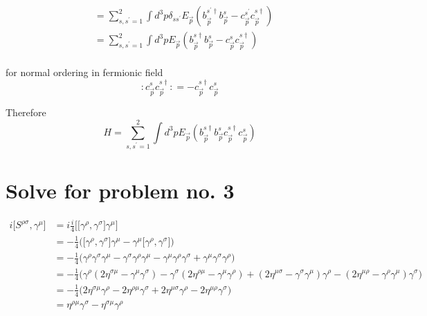 \documentclass[12pt, letterpaper]{article}
\newcommand*{\1}{\hspace{1pt}}
\begin{document}
\begin{align*}
    &= \sum _{s, s^{\prime} = 1} ^{2} \int d ^{3}p \delta _{s s^{\prime}} E_{\overrightarrow{p}}(b^{s ^{\prime} \dagger} _{\overrightarrow{p}}b^{s} _{\overrightarrow{p}} - c^{s ^{\prime}} _{\overrightarrow{p}}c^{s \dagger} _{\overrightarrow{p}}) \\
    &= \sum _{s, s^{\prime} = 1} ^{2} \int d ^{3}p E_{\overrightarrow{p}}(b^{s \dagger} _{\overrightarrow{p}}b^{s} _{\overrightarrow{p}} - c^{s} _{\overrightarrow{p}}c^{s \dagger} _{\overrightarrow{p}}) \\
\end{align*}

for normal ordering in fermionic field 
\begin{equation}
    :c^{s} _{\overrightarrow{p}}c^{s \dagger} _{\overrightarrow{p}}: =  - c^{s \dagger} _{\overrightarrow{p}}c^{s} _{\overrightarrow{p}}
\end{equation}

Therefore 
\begin{equation}
   H = \sum _{s, s^{\prime} = 1} ^{2} \int d ^{3}p E_{\overrightarrow{p}}(b^{s \dagger} _{\overrightarrow{p}}b^{s} _{\overrightarrow{p}} c^{s \dagger} _{\overrightarrow{p}}c^{s} _{\overrightarrow{p}})
\end{equation}

\section*{Solve for problem no. 3}

\begin{align*}
    i \big[ S^{\rho \sigma}, \gamma ^{\mu} \big] &= i \frac{i}{4} \big[ \big[\gamma ^{\rho}, \gamma ^{\sigma}\big] \gamma ^{\mu} \big] \\
    &= - \frac{1}{4} \big( \big[\gamma ^{\rho}, \gamma ^{\sigma}\big] \gamma ^{\mu} - \gamma ^{\mu} \big[\gamma ^{\rho}, \gamma ^{\sigma}\big] \big) \\
    &= - \frac{1}{4} \big( \gamma ^{\rho} \gamma ^{\sigma} \gamma ^{\mu} - \gamma ^{\sigma} \gamma ^{\rho} \gamma ^{\mu} - \gamma ^{\mu} \gamma ^{\rho} \gamma ^{\sigma} + \gamma ^{\mu} \gamma ^{\sigma} \gamma ^{\rho} \big) \\
    &= - \frac{1}{4} \big( \gamma ^{\rho} ( 2 \eta ^{\sigma \mu} - \gamma ^{\mu} \gamma ^{\sigma}) - \gamma ^{\sigma} ( 2 \eta ^{\rho \mu} - \gamma ^{\mu} \gamma ^{\rho}) + ( 2 \eta ^{\mu \sigma} - \gamma ^{\sigma} \gamma ^{\mu}) \gamma ^{\rho} - ( 2 \eta ^{\mu \rho} - \gamma ^{\rho} \gamma ^{\mu})\gamma ^{\sigma} \big)  \\
    &= - \frac{1}{4} \big( 2 \eta ^{\sigma \mu} \gamma^{\rho} - 2 \eta ^{\rho \mu} \gamma^{\sigma} + 2 \eta ^{\mu \sigma} \gamma ^{\rho} - 2 \eta ^{\mu \rho} \gamma ^{\sigma} \big) \\ 
    &= \eta ^{\rho \mu} \gamma ^{\sigma} - \eta ^{\sigma \mu} \gamma ^{\rho}
\end{align*}
\end{document}

